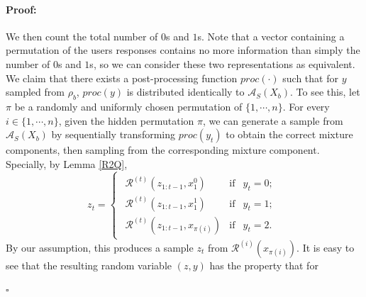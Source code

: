 \documentclass[letterpaper]{article} %
\newenvironment{proof}{\paragraph{Proof:}}{\hfill$\square$}
\begin{document}
\begin{proof}
We then count the total number of $0$s and $1$s. Note that a vector containing a permutation of the users responses contains no more information than simply the number of $0$s and $1$s, so we can consider these two representations as equivalent.\\
We claim that there exists a post-processing function $proc(\cdot)$ such that for $y$ sampled from $\rho_b$, $proc(y)$ is distributed identically to $\mathcal{A}_S(X_b)$.
To see this, let $\pi$ be a randomly and uniformly chosen permutation of $\{1,\cdots,n\}$. For every $i \in \{1,\cdots,n\}$,
given the hidden permutation $\pi$, we can generate a sample from $\mathcal{A}_S(X_b)$ by sequentially transforming $proc(y_t)$ to obtain the correct mixture components, then sampling from the corresponding mixture component. Specially, by Lemma \ref{R2Q},
  \begin{equation}
z_t =
\begin{cases}
    \begin{array}{lll}
        \mathcal{R}^{(t)}(z_{1:t-1},x_1^0) &  \text{if} & y_t = 0; \\
        \mathcal{R}^{(t)}(z_{1:t-1},x_1^1) &  \text{if} & y_t = 1; \\
        \mathcal{R}^{(t)}(z_{1:t-1},x_{\pi(i)}) &  \text{if} & y_t = 2.
    \end{array}
\end{cases}
\end{equation}
By our assumption, this produces a sample $z_t$ from $\mathcal{R}^{(i)}(x_{\pi(i)}).$ It is easy to see that the resulting random variable $(z,y)$ has the property that for

\end{proof}
\end{document}

